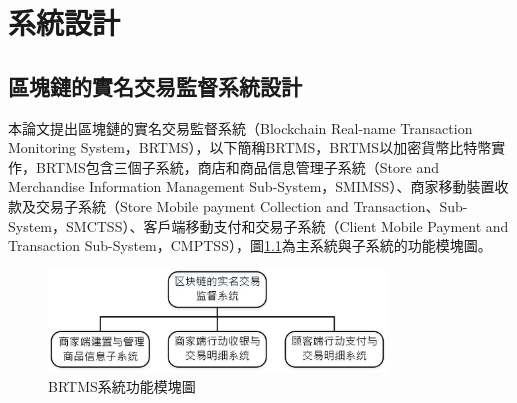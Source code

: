 \chapter{系統設計}

\section{區塊鏈的實名交易監督系統設計}

	本論文提出區塊鏈的實名交易監督系統（Blockchain Real-name Transaction Monitoring System，BRTMS），以下簡稱BRTMS，BRTMS以加密貨幣比特幣實作，BRTMS包含三個子系統，商店和商品信息管理子系統（Store and Merchandise Information Management Sub-System，SMIMSS）、商家移動裝置收款及交易子系統（Store Mobile payment Collection and Transaction、Sub-System，SMCTSS）、客戶端移動支付和交易子系統（Client Mobile Payment and Transaction Sub-System，CMPTSS），圖\ref{model0}為主系統與子系統的功能模塊圖。


	\begin{figure}[!htbp]
		\centering
		\includegraphics[width = 0.8\textwidth]{model0.jpg}
		\caption{BRTMS系統功能模塊圖}\label{model0}
	\end{figure}

